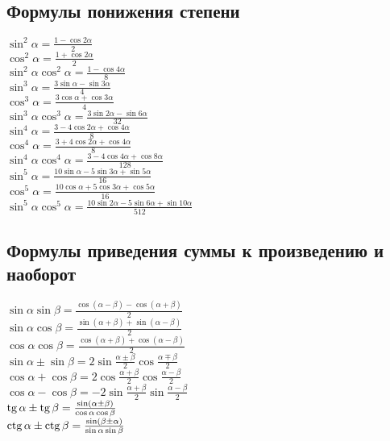 \subsection{Формулы понижения степени}

$\sin^2\alpha = \frac{1 - \cos 2\alpha}{2}$ \\
$\cos^2\alpha = \frac{1 + \cos 2\alpha}{2}$ \\
$\sin^2\alpha \cos^2\alpha = \frac{1 - \cos 4\alpha}{8}$ \\
$\sin^3\alpha = \frac{3 \sin\alpha - \sin 3\alpha}{4}$ \\
$\cos^3\alpha = \frac{3 \cos\alpha + \cos 3\alpha}{4}$ \\
$\sin^3\alpha \cos^3\alpha = \frac{3\sin 2\alpha - \sin 6\alpha}{32}$ \\
$\sin^4\alpha = \frac{3 - 4 \cos 2\alpha + \cos 4\alpha}{8}$ \\
$\cos^4\alpha = \frac{3 + 4 \cos 2\alpha + \cos 4\alpha}{8}$ \\
$\sin^4\alpha \cos^4\alpha = \frac{3-4\cos 4\alpha + \cos 8\alpha}{128}$ \\
$\sin^5\alpha = \frac{10 \sin\alpha - 5 \sin 3\alpha + \sin 5\alpha}{16}$ \\
$\cos^5\alpha = \frac{10 \cos\alpha + 5 \cos 3\alpha + \cos 5\alpha}{16}$ \\
$\sin^5\alpha \cos^5\alpha = \frac{10\sin 2\alpha - 5\sin 6\alpha + \sin 10\alpha}{512}$ \\

\subsection{Формулы приведения суммы к произведению и наоборот}

$ \sin  \alpha  \sin  \beta = \frac{ \cos ( \alpha - \beta) -  \cos ( \alpha + \beta)}{2} $ \\
$ \sin  \alpha  \cos  \beta = \frac{ \sin ( \alpha + \beta) +  \sin ( \alpha - \beta)}{2} $ \\
$ \cos  \alpha  \cos  \beta = \frac{ \cos ( \alpha + \beta) +  \cos ( \alpha - \beta)}{2} $ \\

$ \sin  \alpha \pm  \sin  \beta = 2 \sin \frac{ \alpha \pm \beta}{2} \cos \frac{ \alpha \mp \beta}{2}$ \\
$ \cos  \alpha + \cos  \beta = 2 \cos \frac{ \alpha + \beta}{2} \cos \frac{ \alpha - \beta}{2}$ \\
$ \cos  \alpha - \cos  \beta = - 2 \sin \frac{ \alpha + \beta}{2} \sin \frac{ \alpha - \beta}{2}$ \\
$ \operatorname{tg}  \alpha \pm \operatorname{tg}  \beta = \frac{ \sin ( \alpha \pm \beta)}{ \cos  \alpha \cos  \beta}$ \\
$ \operatorname{ctg}  \alpha \pm \operatorname{ctg}  \beta = \frac{ \sin ( \beta \pm \alpha)}{ \sin  \alpha \sin  \beta}$ \\

